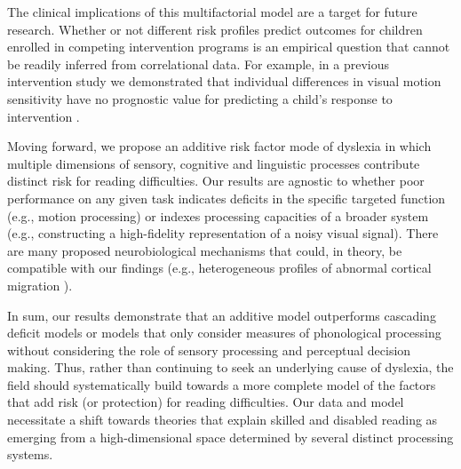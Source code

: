 \documentclass[../uwthesis.tex]{subfiles}
\begin{document}
The clinical implications of this multifactorial model are a target for future research. Whether or not different risk profiles predict outcomes for children enrolled in competing intervention programs is an empirical question that cannot be readily inferred from correlational data. For example, in a previous intervention study we demonstrated that individual differences in visual motion sensitivity have no prognostic value for predicting a child’s response to intervention \citep{Joo2017a}.

Moving forward, we propose an additive risk factor mode of dyslexia in which multiple dimensions of sensory, cognitive and linguistic processes contribute distinct risk for reading difficulties.  Our results are agnostic to whether poor performance on any given task indicates deficits in the specific targeted function (e.g., motion processing) or indexes processing capacities of a broader system (e.g., constructing a high-fidelity representation of a noisy visual signal). There are many proposed neurobiological mechanisms that could, in theory, be compatible with our findings (e.g., heterogeneous profiles of abnormal cortical migration \citep{Hancock2017NeuralDyslexia}). 

In sum, our results demonstrate that an additive model outperforms cascading deficit models or models that only consider measures of phonological processing without considering the role of sensory processing and perceptual decision making. Thus, rather than continuing to seek an underlying cause of dyslexia, the field should systematically build towards a more complete model of the factors that add risk (or protection) for reading difficulties. Our data and model necessitate a shift towards theories that explain skilled and disabled reading as emerging from a high-dimensional space determined by several distinct processing systems. 
\end{document}
